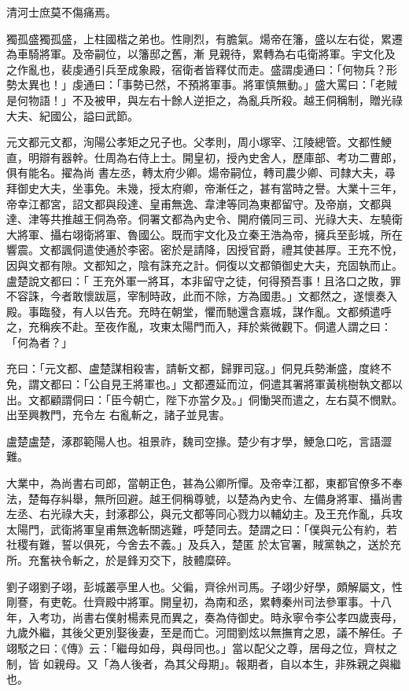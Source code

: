 \begin{pinyinscope}
 清河士庶莫不傷痛焉。



 獨孤盛獨孤盛，上柱國楷之弟也。性剛烈，有膽氣。煬帝在籓，盛以左右從，累遷為車騎將軍。及帝嗣位，以籓邸之舊，漸
 見親待，累轉為右屯衛將軍。宇文化及之作亂也，裴虔通引兵至成象殿，宿衛者皆釋仗而走。盛謂虔通曰：「何物兵？形勢太異也！」虔通曰：「事勢已然，不預將軍事。將軍慎無動。」盛大罵曰：「老賊是何物語！」不及被甲，與左右十餘人逆拒之，為亂兵所殺。越王侗稱制，贈光祿大夫、紀國公，謚曰武節。



 元文都元文都，洵陽公孝矩之兄子也。父孝則，周小塚宰、江陵總管。文都性鯁直，明辯有器幹。仕周為右侍上士。開皇初，授內史舍人，歷庫部、考功二曹郎，俱有能名。擢為尚
 書左丞，轉太府少卿。煬帝嗣位，轉司農少卿、司隸大夫，尋拜御史大夫，坐事免。未幾，授太府卿，帝漸任之，甚有當時之譽。大業十三年，帝幸江都宮，詔文都與段達、皇甫無逸、韋津等同為東都留守。及帝崩，文都與達、津等共推越王侗為帝。侗署文都為內史令、開府儀同三司、光祿大夫、左驍衛大將軍、攝右翊衛將軍、魯國公。既而宇文化及立秦王浩為帝，擁兵至彭城，所在響震。文都諷侗遣使通於李密。密於是請降，因授官爵，禮其使甚厚。王充不悅，因與文都有隙。文都知之，陰有誅充之計。侗復以文都領御史大夫，充固執而止。盧楚說文都曰：「
 王充外軍一將耳，本非留守之徒，何得預吾事！且洛口之敗，罪不容誅，今者敢懷跋扈，宰制時政，此而不除，方為國患。」文都然之，遂懷奏入殿。事臨發，有人以告充。充時在朝堂，懼而馳還含嘉城，謀作亂。文都頻遣呼之，充稱疾不赴。至夜作亂，攻東太陽門而入，拜於紫微觀下。侗遣人謂之曰：「何為者？」



 充曰：「元文都、盧楚謀相殺害，請斬文都，歸罪司寇。」侗見兵勢漸盛，度終不免，謂文都曰：「公自見王將軍也。」文都遷延而泣，侗遣其署將軍黃桃樹執文都以出。文都顧謂侗曰：「臣今朝亡，陛下亦當夕及。」侗慟哭而遣之，左右莫不憫默。出至興教門，充令左
 右亂斬之，諸子並見害。



 盧楚盧楚，涿郡範陽人也。祖景祚，魏司空掾。楚少有才學，鯁急口吃，言語澀難。



 大業中，為尚書右司郎，當朝正色，甚為公卿所憚。及帝幸江都，東都官僚多不奉法，楚每存糾舉，無所回避。越王侗稱尊號，以楚為內史令、左備身將軍、攝尚書左丞、右光祿大夫，封涿郡公，與元文都等同心戮力以輔幼主。及王充作亂，兵攻太陽門，武衛將軍皇甫無逸斬關逃難，呼楚同去。楚謂之曰：「僕與元公有約，若社稷有難，誓以俱死，今舍去不義。」及兵入，楚匿
 於太官署，賊黨執之，送於充所。充奮袂令斬之，於是鋒刃交下，肢體糜碎。



 劉子翊劉子翊，彭城叢亭里人也。父徧，齊徐州司馬。子翊少好學，頗解屬文，性剛謇，有吏乾。仕齊殿中將軍。開皇初，為南和丞，累轉秦州司法參軍事。十八年，入考功，尚書右僕射楊素見而異之，奏為侍御史。時永寧令李公孝四歲喪母，九歲外繼，其後父更別娶後妻，至是而亡。河間劉炫以無撫育之恩，議不解任。子翊駁之曰：《傳》云：「繼母如母，與母同也。」當以配父之尊，居母之位，齊杖之制，皆
 如親母。又「為人後者，為其父母期」。報期者，自以本生，非殊親之與繼也。




\end{pinyinscope}
